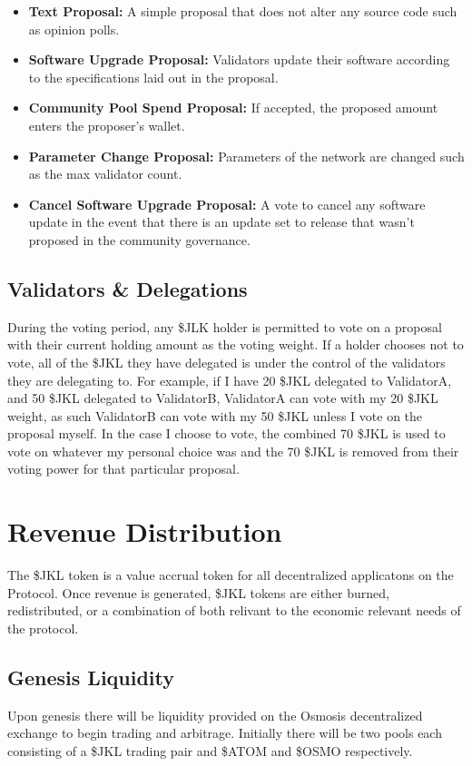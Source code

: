\documentclass[11pt, nofootinbib]{article}
\begin{document}
\begin{itemize}
\item \textbf{Text Proposal:} A simple proposal that does not alter any source code such as opinion polls.
\item \textbf{Software Upgrade Proposal:} Validators update their software according to the specifications laid out in the
proposal.
\item \textbf{Community Pool Spend Proposal:} If accepted, the proposed amount enters the proposer’s wallet.
\item \textbf{Parameter Change Proposal:} Parameters of the network are changed such as the max validator count.
\item \textbf{Cancel Software Upgrade Proposal:} A vote to cancel any software update in the event that there is an
update set to release that wasn’t proposed in the community governance.

\end{itemize}

\subsection{Validators \& Delegations}
During the voting period, any \$JLK holder is permitted to vote on a proposal with their current holding amount
as the voting weight. If a holder chooses not to vote, all of the \$JKL they have delegated is under the control of
the validators they are delegating to.
For example, if I have 20 \$JKL delegated to ValidatorA, and 50 \$JKL delegated to ValidatorB, ValidatorA can
vote with my 20 \$JKL weight, as such ValidatorB can vote with my 50 \$JKL unless I vote on the proposal
myself. In the case I choose to vote, the combined 70 \$JKL is used to vote on whatever my personal choice
was and the 70 \$JKL is removed from their voting power for that particular proposal.

\section{Revenue Distribution}
The \$JKL token is a value accrual token for all decentralized applicatons on the Protocol. Once revenue is generated, \$JKL
tokens are either burned, redistributed, or a combination of both relivant to the economic relevant needs of the
protocol.

\subsection{Genesis Liquidity}
Upon genesis there will be liquidity provided on the Osmosis decentralized exchange to begin trading and arbitrage.
Initially there will be two pools each consisting of a \$JKL trading pair and \$ATOM and \$OSMO
respectively.  
\end{document}
